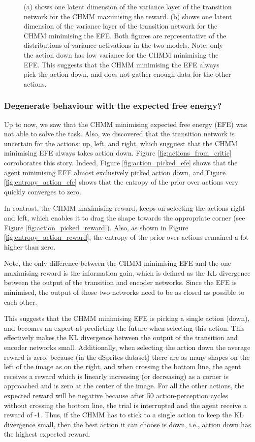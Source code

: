 \documentclass[twoside,11pt]{article}
\begin{document}
\begin{figure}[ht!]
    \caption{(a) shows one latent dimension of the variance layer of the transition network for the CHMM maximising the reward.
             (b) shows one latent dimension of the variance layer of the transition network for the CHMM minimising the EFE.
             Both figures are representative of the distributions of variance activations in the two models.
             Note, only the action down has low variance for the CHMM minimising the EFE.
             This suggests that the CHMM minimising the EFE always pick the action down, and does not gather enough data for the other actions.
    }
    \label{fig:cka-chmm-trans-sa}
\end{figure}

\subsubsection{Degenerate behaviour with the expected free energy?}

Up to now, we saw that the CHMM minimising expected free energy (EFE) was not able to solve the task. Also, we discovered that the transition network is uncertain for the actions: up, left, and right, which sugguest that the CHMM minimising EFE always takes action down. Figure \ref{fig:actions_from_critic} corroborates this story. Indeed, Figure \ref{fig:action_picked_efe} shows that the agent minimising EFE almost exclusively picked action down, and Figure \ref{fig:entropy_action_efe} shows that the entropy of the prior over actions very quickly converges to zero.

In contrast, the CHMM maximising reward, keeps on selecting the actions right and left, which enables it to drag the shape towards the appropriate corner (see Figure \ref{fig:action_picked_reward}). Also, as shown in Figure \ref{fig:entropy_action_reward}, the entropy of the prior over actions remained a lot higher than zero.

Note, the only difference between the CHMM minimising EFE and the one maximising reward is the information gain, which is defined as the KL divergence between the output of the transition and encoder networks. Since the EFE is minimised, the output of those two networks need to be as closed as possible to each other.

This suggests that the CHMM minimising EFE is picking a single action (down), and becomes an expert at predicting the future when selecting this action. This effectively makes the KL divergence between the output of the transition and encoder networks small. Additionally, when selecting the action down the average reward is zero, because (in the dSprites dataset) there are as many shapes on the left of the image as on the right, and when crossing the bottom line, the agent receives a reward which is linearly increasing (or decreasing) as a corner is approached and is zero at the center of the image. For all the other actions, the expected reward will be negative because after 50 action-perception cycles without crossing the bottom line, the trial is interrupted and the agent receive a reward of -1. Thus, if the CHMM has to stick to a single action to keep the KL divergence  small, then the best action it can choose is down, i.e., action down has the highest expected reward.
\end{document}
